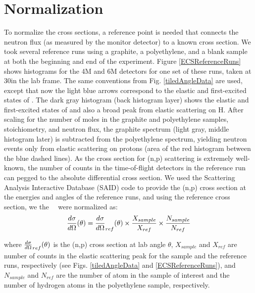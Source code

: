 \section{Normalization}
To normalize the cross sections, a reference point is needed that connects the
neutron flux (as measured by the monitor detector) to a known cross section.
We took several reference runs using a graphite,
a polyethylene, and a blank sample at both the beginning and end of the experiment.
Figure \ref{ECSReferenceRuns} shows histograms for the 4M and 6M detectors for
one set of these runs, taken at 30\textdegree in the lab frame.
The same conventions from Fig.
\ref{tiledAngleData} are used, except that now the light blue arrows correspond to
the elastic and first-excited states of \cTwelve. The dark gray histogram (back
histogram layer) shows the elastic and first-excited states of \cTwelve
and also a broad peak from elastic scattering on H. After scaling for the number
of moles in the graphite and polyethylene samples, stoichiometry, and neutron
flux, the graphite spectrum (light gray, middle histogram later) is subtracted from the polyethylene
spectrum, yielding neutron events only from elastic scattering on protons (area of
the red histogram between the blue dashed lines). As the cross section for
(n,p) scattering is extremely well-known, the number of counts in the
time-of-flight detectors in the reference run can pegged to the absolute
differential cross section.
We used the Scattering Analysis Interactive Database (SAID) code \cite{SAIDCode}
to provide the (n,p) cross section at the energies and angles of the reference
runs, and using the reference cross section, we the \snTwelveFour\
\el\ were normalized as:
\begin{equation} \label{ECSCalculation}
    \frac{d\sigma}{d\Omega}(\theta) = \frac{d\sigma}{d\Omega}_{ref}(\theta)
    \times \frac{X_{sample}}{X_{ref}} \times
    \frac{N_{sample}}{N_{ref}}
\end{equation}

\noindent
where $\frac{d\sigma}{d\Omega}_{ref}(\theta)$ is the (n,p) cross section at lab angle $\theta$, $X_{sample}$
and $X_{ref}$ are number of counts in the elastic scattering peak for the sample
and the reference runs, respectively (see Figs. \ref{tiledAngleData} and
\ref{ECSReferenceRuns}), and $N_{sample}$ and $N_{ref}$ are the number of atom in
the sample of interest and the number of hydrogen atoms in the polyethylene
sample, respectively.

